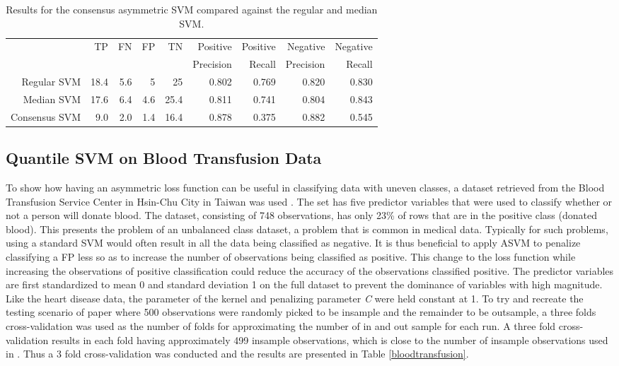 \documentclass[twoside,11pt]{article}
\begin{document}
\begin{table}[htbp]\label{table:HeartDisease3}
  \centering
    \begin{tabular}{rrrrrrrrr}
    \hline
       & \multirow{2}{*}{TP}    & \multirow{2}{*}{FN}    & \multirow{2}{*}{FP}    & \multirow{2}{*}{TN} & Positive & Positive & Negative & Negative\\
&&&&&  Precision &  Recall &  Precision &  Recall \bigstrut\\
    \hline
    \hline
    Regular SVM & 18.4  & 5.6   & 5     & 25    & 0.802 & 0.769 & 0.820 & 0.830 \bigstrut[t]\\
    Median SVM & 17.6  & 6.4   & 4.6   & 25.4  & 0.811 & 0.741 & 0.804 & 0.843 \\
    Consensus SVM & 9.0   & 2.0   & 1.4   & 16.4  & 0.878 & 0.375 & 0.882 & 0.545 \bigstrut[b]\\
    \hline
    \hline
    \end{tabular}%
    \caption{Results for the consensus asymmetric SVM compared against the regular and median SVM.}
\end{table}%


\subsection{Quantile SVM on Blood Transfusion Data}
To show how having an asymmetric loss function can be useful in classifying data with uneven classes, a dataset retrieved from the Blood Transfusion Service Center in Hsin-Chu City in Taiwan was used \citep{Yeh09}. The set has five predictor variables that were used to classify whether or not a person will donate blood. The dataset, consisting of 748 observations, has only 23\% of rows that are in the positive class (donated blood). This presents the problem of an unbalanced class dataset, a problem that is common in medical data. Typically for such problems, using a standard SVM would often result in all the data being classified as negative. It is thus beneficial to apply ASVM to penalize classifying a FP less so as to increase the number of observations being classified as positive. This change to the loss function while increasing the observations of positive classification could reduce the accuracy of the observations classified positive. The predictor variables are first standardized to mean 0 and standard deviation 1 on the full dataset to prevent the dominance of variables with high magnitude. Like the heart disease data, the parameter of the kernel and penalizing parameter \emph{C} were held constant at 1. To try and recreate the testing scenario of \citet{Yeh09} paper where 500 observations were randomly picked to be insample and the remainder to be outsample, a three folds cross-validation was used as the number of folds for approximating the number of in and out sample for each run. A three fold cross-validation results in each fold having approximately 499 insample observations, which is close to the number of insample observations used in \citet{Yeh09}. Thus a 3 fold cross-validation was conducted and the results are presented in Table \ref{bloodtransfusion}.
\end{document}

